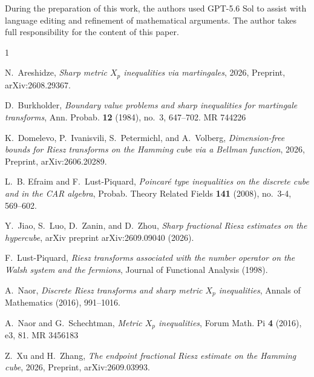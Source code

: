 \documentclass{amsart}
\numberwithin{equation}{section}
\begin{document}
During the preparation of this work, the authors used GPT-5.6 Sol to assist with language editing and refinement of mathematical arguments. The author takes full responsibility for the content of this paper.




%
%

\providecommand{\bysame}{\leavevmode\hbox to3em{\hrulefill}\thinspace}
\providecommand{\MR}{\relax\ifhmode\unskip\space\fi MR }
\providecommand{\MRhref}[2]{%
  \href{http://www.ams.org/mathscinet-getitem?mr=#1}{#2}
}
\providecommand{\href}[2]{#2}
\begin{thebibliography}{1}

N.~Areshidze, \emph{Sharp metric {$X_{p}$} inequalities via martingales}, 2026,
  Preprint, arXiv:2608.29367.

D.~Burkholder, \emph{Boundary value problems and sharp inequalities for
  martingale transforms}, Ann. Probab. \textbf{12} (1984), no.~3, 647--702.
  \MR{744226}

K.~Domelevo, P.~Ivanisvili, S.~Petermichl, and A.~Volberg, \emph{Dimension-free
  bounds for {R}iesz transforms on the {H}amming cube via a {B}ellman
  function}, 2026, Preprint, arXiv:2606.20289.

L.~B. Efraim and F.~Lust-Piquard, \emph{Poincar\'{e} type inequalities on the
  discrete cube and in the {CAR} algebra}, Probab. Theory Related Fields
  \textbf{141} (2008), no.~3-4, 569--602.

Y.~Jiao, S.~Luo, D.~Zanin, and D.~Zhou, \emph{Sharp fractional {R}iesz
  estimates on the hypercube}, arXiv preprint arXiv:2609.09040 (2026).

F.~Lust-Piquard, \emph{Riesz transforms associated with the number operator on
  the {W}alsh system and the fermions}, Journal of Functional Analysis (1998).

A.~Naor, \emph{Discrete {R}iesz transforms and sharp metric ${X}_p$
  inequalities}, Annals of Mathematics (2016), 991--1016.

A.~Naor and G.~Schechtman, \emph{Metric {$X_{p}$} inequalities}, Forum Math. Pi
  \textbf{4} (2016), e3, 81. \MR{3456183}

Z.~Xu and H.~Zhang, \emph{The endpoint fractional {R}iesz estimate on the
  {H}amming cube}, 2026, Preprint, arXiv:2609.03993.

\end{thebibliography}
\end{document}
